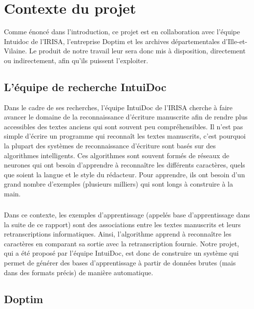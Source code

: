 \chapter{Contexte du projet}

Comme énoncé dans l’introduction, ce projet est en collaboration avec l’équipe Intuidoc de l’IRISA,
l’entreprise Doptim et les archives départementales d'Ille-et-Vilaine. Le produit de notre travail
leur sera donc mis à disposition, directement ou indirectement, afin qu’ils puissent l’exploiter.

\section{L’équipe de recherche IntuiDoc}

Dans le cadre de ses recherches, l’équipe IntuiDoc de l’IRISA cherche à faire avancer le domaine
de la reconnaissance d’écriture manuscrite afin de rendre plus accessibles des textes anciens qui
sont souvent peu compréhensibles. Il n’est pas simple d’écrire un programme qui reconnaît les textes
manuscrits, c’est pourquoi la plupart des systèmes de reconnaissance d’écriture sont basés sur des
algorithmes intelligents. Ces algorithmes sont souvent formés de réseaux de neurones qui ont besoin
d’apprendre à reconnaître les différents caractères, quels que soient la langue et le style du rédacteur.
Pour apprendre, ils ont besoin d’un grand nombre d’exemples (plusieurs milliers) qui sont longs
à construire à la main. 

\paragraph{}
Dans ce contexte, les exemples d’apprentissage (appelés base d’apprentissage dans la suite de ce rapport)
sont des associations entre les textes manuscrits et leurs retranscriptions informatiques. Ainsi,
l’algorithme apprend à reconnaître les caractères en comparant sa sortie avec la retranscription fournie.
Notre projet, qui a été proposé par l’équipe IntuiDoc, est donc de construire un système qui
permet de générer des bases d’apprentissage à partir de données brutes (mais dans des formats précis)
de manière automatique.

\section{Doptim}

